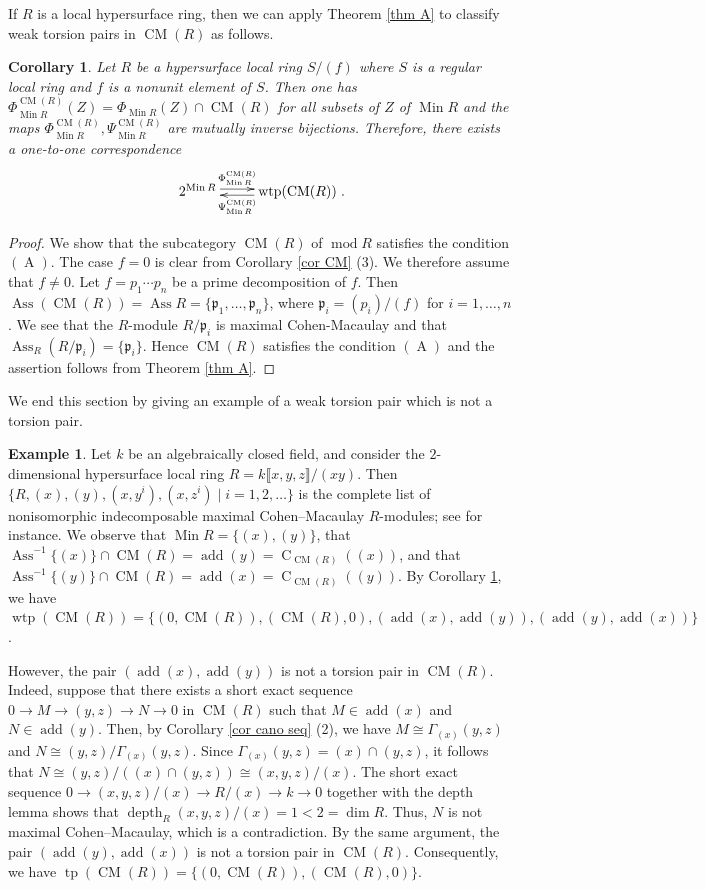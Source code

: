 \documentclass{amsart}
\newtheorem{cor}[thm]{Corollary}
\theoremstyle{definition}
\newtheorem{ex}[thm]{Example}
\theoremstyle{remark}
\def\AA{\operatorname{A}}
\def\add{\operatorname{add}}
\def\Ass{\operatorname{Ass}}
\def\CC{\operatorname{C}}
\def\CM{\operatorname{CM}}
\def\depth{\operatorname{depth}}
\def\dim{\operatorname{dim}}
\def\Min{\operatorname{Min}}
\def\mod{\operatorname{mod}}
\def\p{\mathfrak{p}}
\def\tp{\operatorname{tp}}
\def\wtp{\operatorname{wtp}}
\begin{document}
If $R$ is a local hypersurface ring, then we can apply Theorem \ref{thm A} to classify weak torsion pairs in $\CM(R)$ as follows.

\begin{cor}\label{cor HS}
Let $R$ be a hypersurface local ring $S/(f)$ where $S$ is a regular local ring and $f$ is a nonunit element of $S$. Then one has $\Phi^{\CM(R)}_{\Min R}(Z)=\Phi_{\Min R}(Z)\cap\CM(R)$ for all subsets of $Z$ of $\Min R$ and the maps $\Phi^{\CM(R)}_{\Min R},\Psi^{\CM(R)}_{\Min R}$ are mutually inverse bijections. Therefore, there exists a one-to-one correspondence
\[\xymatrix{2^{\Min R}\ar@<0.5ex>[r]^-{\Phi^{\CM(R)}_{\Min R}}&\wtp(\CM(R))\ar@<0.5ex>[l]^-{\Psi^{\CM(R)}_{\Min R}}}.\]
\end{cor}

\begin{proof}
We show that the subcategory $\CM(R)$ of $\mod R$ satisfies the condition $(\AA)$. The case $f=0$ is clear from Corollary \ref{cor CM} (3). We therefore assume that $f\ne0$. Let $f=p_1\cdots p_n$ be a prime decomposition of $f$. Then $\Ass(\CM(R))=\Ass R=\{\p_1,\dots,\p_n\}$, where $\p_i=(p_i)/(f)$ for $i=1,\dots,n$. We see that the $R$-module $R/\p_i$ is maximal Cohen-Macaulay and that $\Ass_R(R/\p_i)=\{\p_i\}$. Hence $\CM(R)$ satisfies the condition $(\AA)$ and the assertion follows from Theorem \ref{thm A}.
\end{proof}

We end this section by giving an example of a weak torsion pair which is not a torsion pair.

\begin{ex}
Let $k$ be an algebraically closed field, and consider the $2$-dimensional hypersurface local ring $R=k\llbracket x,y,z\rrbracket/(xy)$.
Then $\{R,(x), (y),(x,y^i),(x,z^i)\mid i=1,2,\dots\}$ is the complete list of nonisomorphic indecomposable maximal Cohen--Macaulay $R$-modules; see \cite[Theorem 5.3]{BD} for instance. 
We observe that $\Min R=\{(x),(y)\}$, that $\Ass^{-1}\{(x)\}\cap\CM(R)=\add(y)=\CC_{\CM(R)}((x))$, and that $\Ass^{-1}\{(y)\}\cap\CM(R)=\add (x)=\CC_{\CM(R)}((y))$. 
By Corollary \ref{cor HS}, we have $\wtp(\CM(R))=\{(0,\CM(R)),(\CM(R),0), (\add(x),\add(y)),(\add(y),\add(x))\}$.

However, the pair $(\add(x),\add(y))$ is not a torsion pair in $\CM(R)$. 
Indeed, suppose that there exists a short exact sequence $0\to M\to (y,z)\to N\to0$ in $\CM(R)$ such that $M\in\add(x)$ and $N\in\add(y)$. 
Then, by Corollary \ref{cor cano seq} (2), we have $M\cong\Gamma_{(x)}(y,z)$ and $N\cong(y,z)/\Gamma_{(x)}(y,z)$. 
Since $\Gamma_{(x)}(y,z)=(x)\cap(y,z)$, it follows that $N\cong(y,z)/((x)\cap(y,z))\cong(x,y,z)/(x)$. 
The short exact sequence $0\to(x,y,z)/(x)\to R/(x)\to k\to0$ together with the depth lemma shows that $\depth_R(x,y,z)/(x)=1<2=\dim R$. Thus, $N$ is not maximal Cohen--Macaulay, which is a contradiction. By the same argument, the pair $(\add(y),\add(x))$ is not a torsion pair in $\CM(R)$. Consequently, we have $\tp(\CM(R))=\{(0,\CM(R)),(\CM(R),0)\}$.
\end{ex}
\end{document}
